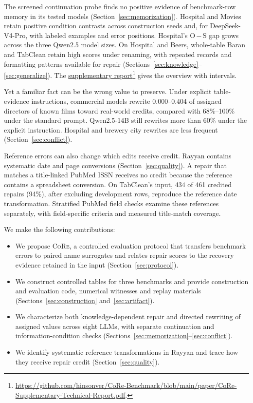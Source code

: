 \documentclass[sigconf, nonacm]{acmart}
\newcommand{\core}{\textsc{CoRe}}
\newcommand{\companion}{\href{https://github.com/hinsonver/CoRe-Benchmark/raw/refs/heads/main/paper/CoRe-Supplementary-Technical-Report.pdf}{supplementary report}}
\begin{document}
The screened continuation probe finds no positive evidence of benchmark-row memory in its tested
models (Section~\ref{sec:memorization}). Hospital and Movies retain positive condition contrasts
across construction seeds and, for DeepSeek-V4-Pro, with labeled examples and error positions.
Hospital's O\,$-$\,S gap grows across the three Qwen2.5 model sizes. On Hospital and Beers,
whole-table Baran and TabClean retain high scores under renaming, with repeated records and
formatting patterns available for repair (Sections~\ref{sec:knowledge}--\ref{sec:generalize}).
The \companion{}\footnote{\url{https://github.com/hinsonver/CoRe-Benchmark/blob/main/paper/CoRe-Supplementary-Technical-Report.pdf}.} gives the overview with intervals.

Yet a familiar fact can be the wrong value to preserve. Under explicit table-evidence
instructions, commercial models rewrite 0.000--0.404 of assigned directors of known films
toward real-world credits, compared with 68\%--100\% under the standard prompt. Qwen2.5-14B
still rewrites more than 60\% under the explicit instruction. Hospital and brewery city
rewrites are less frequent (Section~\ref{sec:conflict}).

Reference errors can also change which edits receive credit. Rayyan contains systematic date and page
conversions (Section~\ref{sec:quality}). A repair that matches a title-linked PubMed ISSN
receives no credit because the reference contains a spreadsheet conversion. On TabClean's
input, 434 of 461 credited repairs (94\%), after excluding development rows, reproduce the
reference date transformation. Stratified PubMed field checks examine these references
separately, with field-specific criteria and measured title-match coverage.

\noindent We make the following contributions:
\begin{itemize}
  \item We propose \core{}, a controlled evaluation protocol that transfers benchmark errors
  to paired name surrogates and relates repair scores to the recovery evidence retained in
  the input (Section~\ref{sec:protocol}).
  \item We construct controlled tables for three benchmarks and provide construction and
  evaluation code, numerical witnesses and replay materials
  (Sections~\ref{sec:construction} and~\ref{sec:artifact}).
  \item We characterize both knowledge-dependent repair and directed rewriting of assigned
  values across eight LLMs, with separate continuation and information-condition checks
  (Sections~\ref{sec:memorization}--\ref{sec:conflict}).
  \item We identify systematic reference transformations in Rayyan and trace how they receive
  repair credit (Section~\ref{sec:quality}).
\end{itemize}
\end{document}
